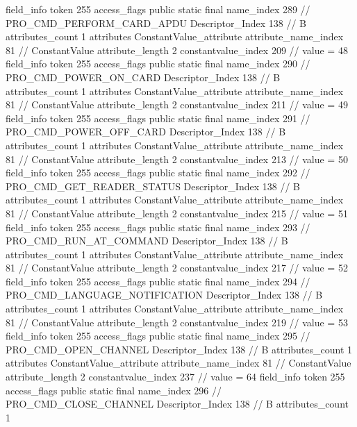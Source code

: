 {{{{{{{				}
				}
			}
			field_info {
				token	255
				access_flags	public static final
				name_index	289		// PRO_CMD_PERFORM_CARD_APDU
				Descriptor_Index	138		// B
				attributes_count	1
				attributes {
				ConstantValue_attribute {
					attribute_name_index	81		// ConstantValue
					attribute_length	2
					constantvalue_index	209		// value = 48
				}
				}
			}
			field_info {
				token	255
				access_flags	public static final
				name_index	290		// PRO_CMD_POWER_ON_CARD
				Descriptor_Index	138		// B
				attributes_count	1
				attributes {
				ConstantValue_attribute {
					attribute_name_index	81		// ConstantValue
					attribute_length	2
					constantvalue_index	211		// value = 49
				}
				}
			}
			field_info {
				token	255
				access_flags	public static final
				name_index	291		// PRO_CMD_POWER_OFF_CARD
				Descriptor_Index	138		// B
				attributes_count	1
				attributes {
				ConstantValue_attribute {
					attribute_name_index	81		// ConstantValue
					attribute_length	2
					constantvalue_index	213		// value = 50
				}
				}
			}
			field_info {
				token	255
				access_flags	public static final
				name_index	292		// PRO_CMD_GET_READER_STATUS
				Descriptor_Index	138		// B
				attributes_count	1
				attributes {
				ConstantValue_attribute {
					attribute_name_index	81		// ConstantValue
					attribute_length	2
					constantvalue_index	215		// value = 51
				}
				}
			}
			field_info {
				token	255
				access_flags	public static final
				name_index	293		// PRO_CMD_RUN_AT_COMMAND
				Descriptor_Index	138		// B
				attributes_count	1
				attributes {
				ConstantValue_attribute {
					attribute_name_index	81		// ConstantValue
					attribute_length	2
					constantvalue_index	217		// value = 52
				}
				}
			}
			field_info {
				token	255
				access_flags	public static final
				name_index	294		// PRO_CMD_LANGUAGE_NOTIFICATION
				Descriptor_Index	138		// B
				attributes_count	1
				attributes {
				ConstantValue_attribute {
					attribute_name_index	81		// ConstantValue
					attribute_length	2
					constantvalue_index	219		// value = 53
				}
				}
			}
			field_info {
				token	255
				access_flags	public static final
				name_index	295		// PRO_CMD_OPEN_CHANNEL
				Descriptor_Index	138		// B
				attributes_count	1
				attributes {
				ConstantValue_attribute {
					attribute_name_index	81		// ConstantValue
					attribute_length	2
					constantvalue_index	237		// value = 64
				}
				}
			}
			field_info {
				token	255
				access_flags	public static final
				name_index	296		// PRO_CMD_CLOSE_CHANNEL
				Descriptor_Index	138		// B
				attributes_count	1
}}}}}

